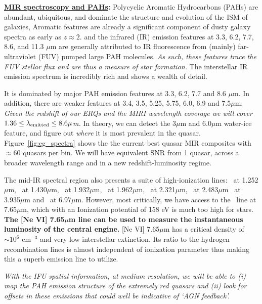 \smallskip
\smallskip
\noindent
{\bf \underline{MIR spectroscopy and PAHs}:}
Polycyclic Aromatic Hydrocarbons (PAHs) are abundant, ubiquitous, and
dominate the structure and evolution of the ISM of galaxies, 
Aromatic features are already a significant component of
dusty galaxy spectra as early as $z\approx2$.  and the infrared (IR)
emission features at 3.3, 6.2, 7.7, 8.6, and 11.3 $\mu$m are generally
attributed to IR fluorescence from (mainly) far-ultraviolet (FUV)
pumped large PAH molecules. {\it As such, these features trace the FUV
stellar flux and are thus a measure of star formation.} The
interstellar IR emission spectrum is incredibly rich and shows a
wealth of detail. {It is dominated by major PAH emission features at
3.3, 6.2, 7.7 and 8.6 $\mu$m.  In addition, there are weaker features
at 3.4, 3.5, 5.25, 5.75, 6.0, 6.9 and 7.5$\mu$m. {\it Given the
redshift of our ERQs and the MIRI wavelength coverage we will cover
$1.36 \leq \lambda_{\rm emitted} \leq 8.6 \mu$m.}  In theory, we can
detect the 3$\mu$m and 6.0$\mu$m water-ice feature, and figure out
{\it where} it is most prevalent in the quasar. Figure~\ref{fig:eg_spectra} shows the
the current best quasar MIR composites with $\approx$60 quasars per bin. 
We will have equivalent SNR from 1 quasar, across a broader wavelength range
and in a new redshift-luminosity regime. 

\smallskip
\smallskip
\noindent
The mid-IR spectral region also presents a suite of high-ionization
lines: \snine\ at 1.252$\mu$m, \six\ at 1.430$\mu$m, \sixi\ at
1.932$\mu$m, \sivi\ at 1.962$\mu$m, \caviii\ at 2.321$\mu$m, \sivi\ at
2.483$\mu$m \siix\ at 3.935$\mu$m and \arii\ at 6.97$\mu$m.  However,
most critically, we have access to the \nevi\ line at 7.65$\mu$m,
which with an Ionization potential of 158 eV is much too high for
stars.  {\bf The [Ne VI] 7.65$\mu$m line can be used to measure the
instantaneous luminosity of the central engine.}  [Ne VI] 7.65$\mu$m
has a critical density of $\sim10^{6}$ cm$^{-3}$ and very low
interstellar extinction.  Its ratio to the hydrogen recombination
lines is almost independent of ionization parameter thus making this a
superb emission line to utilize.

\smallskip
\smallskip
\noindent
{\it With the IFU spatial information, at medium resolution, we will be able to 
(i) map the PAH emission structure of the extremely red quasars and (ii) look 
for offsets in these emissions that could well be indicative of `AGN feedback'.}

}
